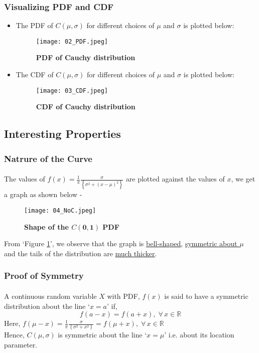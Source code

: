 \documentclass[12pt, fleqn, a4paper]{article}
\newcommand{\chy}{\(\mathit{C}(\mu, \sigma)\) }
\begin{document}
	\subsubsection{Visualizing PDF and CDF}
	\begin{itemize}
		\item The PDF of \chy for different choices of \(\mu\) and \(\sigma\) is plotted below: 
		\begin{figure}[H] \centering
			\texttt{[image: 02\_PDF.jpeg]}
			\caption{\textbf{PDF of Cauchy distribution}}
		\end{figure}
		\item The CDF of \chy for different choices of \(\mu\) and \(\sigma\) is plotted below: 
		\begin{figure}[H] \centering
			\texttt{[image: 03\_CDF.jpeg]}
			\caption{\textbf{CDF of Cauchy distribution}}
		\end{figure}
	\end{itemize}
	
	\subsection{Interesting Properties}
	\subsubsection{Natrure of the Curve}
	\paragraph{} The values of \(f(x)=\frac{1}{\pi} \frac{\sigma}{\left\{\sigma^2+(x-\mu)^2\right\}}\) are plotted against the values of \(x\), we get a graph as shown below - 
	\begin{figure}[H] \centering
		\texttt{[image: 04\_NoC.jpeg]}
		\caption{\textbf{Shape of the \(\mathbf{\mathit{C}(0,1)}\) PDF}} 
		\label{noc}
	\end{figure}
	From `Figure \ref{noc}', we observe that the graph is \underline{bell-shaped}, \underline{symmetric about \(\mu\)} and the tails of the distribution are \underline{much thicker}.
	
	\subsubsection*{Proof of Symmetry} \label{symmetry}
	\paragraph{} A continuous random variable \(X\) with PDF, \(f(x)\) is said to have a symmetric distribution about the line `\(x=a\)' if, $$ f(a-x)=f(a+x),\;\forall\,x\in \mathbb{R} $$ Here, \(f(\mu-x)=\frac{1}{\pi} \frac{\sigma}{\left\{\sigma^2+x^2\right\}}=f(\mu+x),\; \forall\,x\in\mathbb{R}\) \\[15pt] Hence, \chy is symmetric about the line `\(x=\mu\)' i.e. about its location parameter.
	
\end{document}
